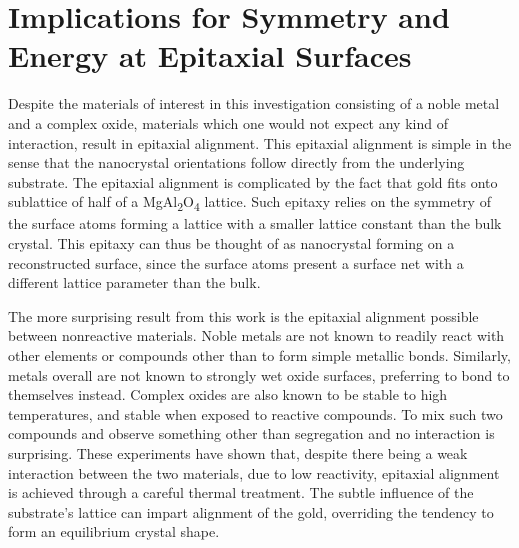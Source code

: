 \section{Implications for Symmetry and Energy at Epitaxial Surfaces}
Despite the materials of interest in this investigation consisting of a noble metal and a complex oxide, materials which one would not expect any kind of interaction, result in epitaxial alignment.
This epitaxial alignment is simple in the sense that the nanocrystal orientations follow directly from the underlying substrate.
The epitaxial alignment is complicated by the fact that gold fits onto sublattice of half of a MgAl\textsubscript{2}O\textsubscript{4} lattice.
Such epitaxy relies on the symmetry of the surface atoms forming a lattice with a smaller lattice constant than the bulk crystal.
This epitaxy can thus be thought of as nanocrystal forming on a reconstructed surface, since the surface atoms present a surface net with a different lattice parameter than the bulk.

The more surprising result from this work is the epitaxial alignment possible between nonreactive materials.
Noble metals are not known to readily react with other elements or compounds other than to form simple metallic bonds.
Similarly, metals overall are not known to strongly wet oxide surfaces, preferring to bond to themselves instead.
Complex oxides are also known to be stable to high temperatures, and stable when exposed to reactive compounds.
To mix such two compounds and observe something other than segregation and no interaction is surprising.
These experiments have shown that, despite there being a weak interaction between the two materials, due to low reactivity, epitaxial alignment is achieved through a careful thermal treatment.
The subtle influence of the substrate's lattice can impart alignment of the gold, overriding the tendency to form an equilibrium crystal shape.
